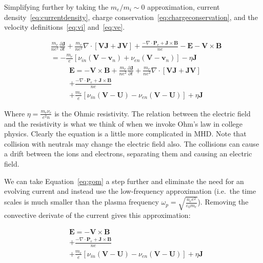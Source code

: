 \documentclass[12pt,upcase]{umlthesis}
\begin{document}
Simplifying further by taking the $m_e/m_i \sim 0$ approximation, current density~\ref{eq:currentdensity}, charge conservation~\ref{eq:chargeconservation}, and the velocity definitions~\ref{eq:vi} and~\ref{eq:ve}.

\begin{equation}
\begin{aligned}
	&\frac{m_e}{n e^2} \frac{\partial\textbf{J}}{\partial t}+ \frac{m_e}{ne^2} \nabla\cdot[\textbf{V}\textbf{J} + \textbf{J}\textbf{V}] + \frac{-\nabla\cdot\textbf{P}_e + \textbf{J}\times\textbf{B}}{ne}- \textbf{E} - \textbf{V}\times\textbf{B} \\
	& = - \frac{m_e}{e}[\nu_{in} (\textbf{V}-\textbf{v}_n) + \nu_{en}(\textbf{V} - \textbf{v}_n)] - \eta\textbf{J}
\end{aligned}
\end{equation}
\begin{equation}\label{eq:gom}
\begin{aligned}
	&\textbf{E}  = - \textbf{V}\times\textbf{B} + \frac{m_e}{n e^2} \frac{\partial\textbf{J}}{\partial t}+ \frac{m_e}{ne^2} \nabla\cdot[\textbf{V}\textbf{J} + \textbf{J}\textbf{V}] \\
	&+ \frac{-\nabla\cdot\textbf{P}_e + \textbf{J}\times\textbf{B}}{ne} \\
	&  + \frac{m_e}{e}[\nu_{in} (\textbf{V}-\textbf{U}) - \nu_{en}(\textbf{V} - \textbf{U})] + \eta\textbf{J}
\end{aligned}
\end{equation}


Where $\eta = \frac{m_e \nu_e}{e^2 n}$ is the Ohmic resistivity. The relation between the electric field and the resistivity is what we think of when we invoke Ohm's law in college physics. Clearly the equation is a little more complicated in MHD\@. Note that collision with neutrals may change the electric field also. The collisions can cause a drift between the ions and electrons, separating them and causing an electric field.

We can take Equation~\ref{eq:gom} a step further and eliminate the need for an evolving current and instead use the low-frequency approximation (i.e.\ the time scales is much smaller than the plasma frequency $\omega_p = \sqrt{\frac{n_e e^2}{\varepsilon_0 m_e}}$). Removing the convective derivate of the current gives this approximation:

\begin{equation}\label{eq:gomlowfreq}
\begin{aligned}
	&\textbf{E}  = - \textbf{V}\times\textbf{B} \\
	&+ \frac{-\nabla\cdot\textbf{P}_e + \textbf{J}\times\textbf{B}}{ne} \\
	&  + \frac{m_e}{e}[\nu_{in} (\textbf{V}-\textbf{U}) - \nu_{en}(\textbf{V} - \textbf{U})] + \eta\textbf{J}
\end{aligned}
\end{equation}
\end{document}
